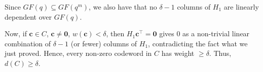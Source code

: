 \begin{Proof}{}{}
    \vspace{1mm}

    Since $ GF(q)\subseteq GF(q^m) $, we also have that no $ \delta-1 $ columns
    of $ H_1 $ are linearly dependent over $ GF(q) $.

    Now, if $ \symbf{c}\in C $, $ \symbf{c}\neq \symbf{0} $, $ w(\symbf{c})<\delta $,
    then $ H_1\symbf{c}^\top=\symbf{0} $ gives $ 0 $ as a non-trivial
    linear combination of $ \delta-1 $ (or fewer) columns of $ H_1 $,
    contradicting the fact what we just proved. Hence, every
    non-zero codeword in $ C $ has weight $ \geqslant \delta $.
    Thus, $ d(C)\geqslant \delta $.
\end{Proof}
